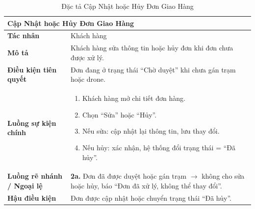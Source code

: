 \begin{table}[H]
  \centering
  \begin{tabularx}{\textwidth}{|l|X|}
    \hline
    \multicolumn{2}{|l|}{\textbf{Cập Nhật hoặc Hủy Đơn Giao Hàng}} \\
    \hline
    \textbf{Tác nhân}           & Khách hàng \\ \hline
    \textbf{Mô tả}              & Khách hàng sửa thông tin hoặc hủy đơn khi đơn chưa được xử lý. \\ \hline
    \textbf{Điều kiện tiên quyết} & Đơn đang ở trạng thái ``Chờ duyệt'' khi chưa gán trạm hoặc drone. \\ \hline
    \textbf{Luồng sự kiện chính} &
      \begin{enumerate}[leftmargin=*, nosep, topsep=0pt]
        \item Khách hàng mở chi tiết đơn hàng.
        \item Chọn ``Sửa'' hoặc ``Hủy''.
        \item Nếu sửa: cập nhật lại thông tin, lưu thay đổi.
        \item Nếu hủy: xác nhận, hệ thống đổi trạng thái = ``Đã hủy''.
      \end{enumerate} \\ \hline
    \textbf{Luồng rẽ nhánh / Ngoại lệ} &
      \textbf{2a.} Đơn đã được duyệt hoặc gán trạm $\rightarrow$ không cho sửa hoặc hủy, báo ``Đơn đã xử lý, không thể thay đổi''. \\ \hline
    \textbf{Hậu điều kiện}      & Đơn được cập nhật hoặc chuyển trạng thái ``Đã hủy''. \\
    \hline
  \end{tabularx}
  \caption{Đặc tả Cập Nhật hoặc Hủy Đơn Giao Hàng}
  \label{tab:uc03}
\end{table}

